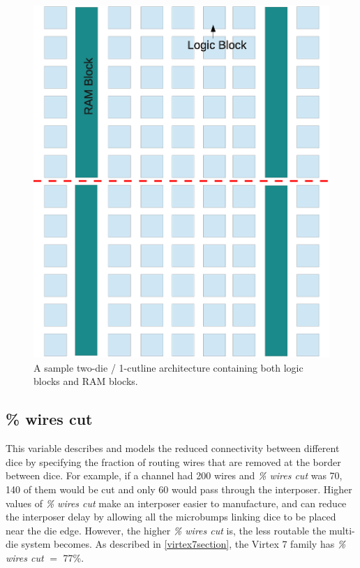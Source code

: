 \documentclass{sig-alternate-2013}
\begin{document}
\begin{figure}[!htbp]
\centering
\includegraphics[width=\linewidth]{fpga.eps}
\caption{A sample two-die / 1-cutline architecture containing both logic blocks and RAM blocks.}
\label{fig:fpga}
\end{figure}

\subsection{\% wires cut}
This variable describes and models the reduced connectivity between different dice by specifying the fraction of routing wires that are removed at the border between dice. For example, if a channel had 200 wires and \textit{\% wires cut} was 70, 140 of them would be cut and only 60 would pass through the interposer. Higher values of \textit{\% wires cut} make an interposer easier to manufacture, and can reduce the interposer delay by allowing all the microbumps linking dice to be placed near the die edge. However, the higher \textit{\% wires cut} is, the less routable the multi-die system becomes. As described in \ref{virtex7section}, the Virtex 7 family has \textit{\% wires cut} $=$ 77\%.
\end{document}

